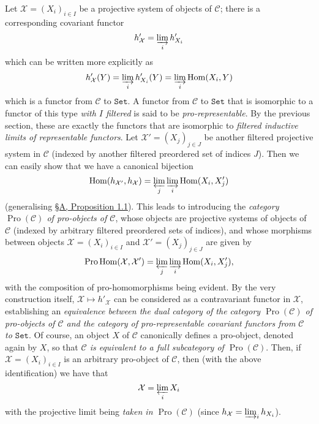 \documentclass{article}
\newcommand{\oldpage}[1]{\marginpar{\footnotesize$\Big\vert$ \textit{p.~#1}}}
\theoremstyle{definition}
\theoremstyle{definition}
\theoremstyle{definition}
\theoremstyle{definition}
\theoremstyle{remark}
\begin{document}
Let \({\mathcal{X}}=(X_i)_{i\in I}\) be a projective system of objects of \({\mathcal{C}}\);
there is a corresponding covariant functor
\[
  h'_{{\mathcal{X}}} = \varinjlim_i h'_{X_i}
\]
which can be written more explicitly as
\[
  h'_{{\mathcal{X}}}(Y) = \varinjlim_i h'_{X_i}(Y) = \varinjlim_i\operatorname{Hom}(X_i,Y)
\]
which is a functor from \({\mathcal{C}}\) to \(\mathtt{Set}\).
A functor from \({\mathcal{C}}\) to \(\mathtt{Set}\) that is isomorphic to a functor of this type \emph{with \(I\) filtered} is said to be \emph{pro-representable}.
By the previous section, these are exactly the functors that are isomorphic to \emph{filtered inductive limits of representable functors}.
Let \({\mathcal{X}}'=(X_j)_{j\in J}\) be another filtered projective system in \({\mathcal{C}}\) (indexed by another filtered preordered set of indices \(J\)).
Then we can easily show that we have a canonical bijection
\[
  \operatorname{Hom}(h_{{\mathcal{X}}'},h_{{\mathcal{X}}}) = \varprojlim_j\varinjlim_i\operatorname{Hom}(X_i,X'_j)
\]
(generalising \protect\hyperlink{fga-3-ii-section-A.1-proposition-1.1}{§A, Proposition 1.1}).
This leads to introducing the \emph{category \(\operatorname{Pro}({\mathcal{C}})\) of pro-objects of \({\mathcal{C}}\)}, whose objects are projective systems of objects of \({\mathcal{C}}\) (indexed by arbitrary filtered preordered sets of indices), and whose morphisms between objects \({\mathcal{X}}=(X_i)_{i\in I}\) and \({\mathcal{X}}'=(X_j)_{j\in J}\) are given by
\[
  \operatorname{Pro}\operatorname{Hom}({\mathcal{X}},{\mathcal{X}}') = \varprojlim_j\varinjlim_i\operatorname{Hom}(X_i,X'_j),
\]
with the composition of pro-homomorphisms being evident.
By the very construction itself, \({\mathcal{X}}\mapsto h'_{{\mathcal{X}}}\) can be considered as a contravariant functor in \({\mathcal{X}}\), establishing an \emph{equivalence between the dual category of the category \(\operatorname{Pro}({\mathcal{C}})\) of pro-objects of \({\mathcal{C}}\) and the category of pro-representable covariant functors from \({\mathcal{C}}\) to \(\mathtt{Set}\)}.
\oldpage{195-04}Of course, an object \(X\) of \({\mathcal{C}}\) canonically defines a pro-object, denoted again by \(X\), so that \emph{\({\mathcal{C}}\) is equivalent to a full subcategory of \(\operatorname{Pro}({\mathcal{C}})\)}.
Then, if \({\mathcal{X}}=(X_i)_{i\in I}\) is an arbitrary pro-object of \({\mathcal{C}}\), then (with the above identification) we have that
\[
  {\mathcal{X}} = \varprojlim_i X_i
\]
with the projective limit being \emph{taken in \(\operatorname{Pro}({\mathcal{C}})\)} (since \(h_{{\mathcal{X}}}=\varinjlim_i h_{X_i}\)).
\end{document}
